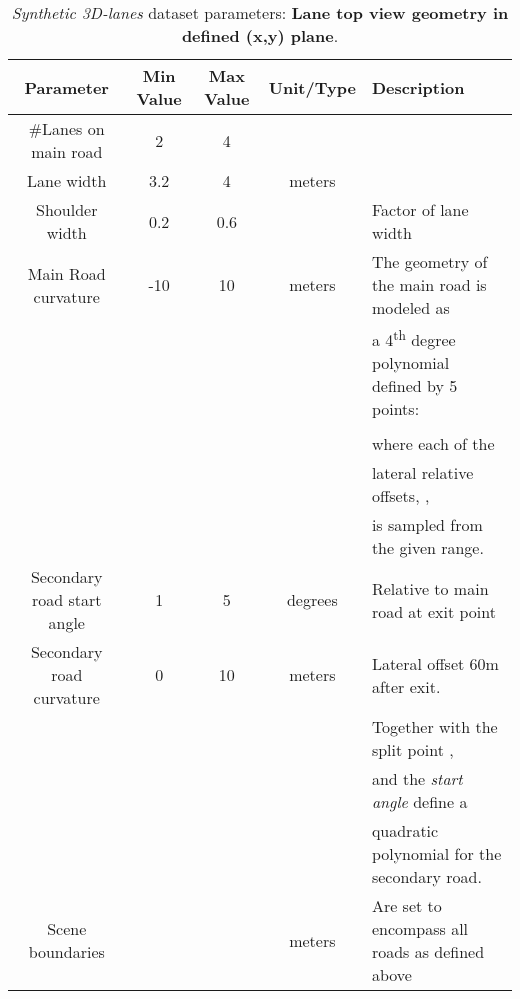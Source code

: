\documentclass[10pt,twocolumn,letterpaper]{article}
\begin{document}
\vspace{5cm}
\begin{table*}[h]
	\centering
	\caption{\emph{Synthetic 3D-lanes} dataset parameters: \textbf{Lane top view geometry in defined (x,y) plane}.}
	\begin{tabular} {ccccl}
		\toprule
		\textbf{Parameter} &  \textbf{Min Value} &  \textbf{Max Value} & \textbf{Unit/Type} & \textbf{Description}  \\
		\toprule		
		\#Lanes on main road & 2 & 4 & & \\
		\midrule
		Lane width & 3.2 & 4 & meters& \\
		\midrule
		Shoulder width & 0.2 & 0.6 & & Factor of lane width \\
		\midrule
		
		Main Road curvature & -10& 10& meters& The geometry of the main road is modeled as \\ 
		& & & & a 4\textsuperscript{th} degree polynomial defined by 5 points: \\
		& & & & \\
		& & & &  where each of the \\
		& & & & lateral relative offsets, , \\
		& & & & is sampled from the given range. \\
		
		\midrule
		
		Secondary road start angle & 1 & 5 & degrees & Relative to main road at exit point\\
		\midrule
		
		Secondary road curvature & 0  & 10  & meters & Lateral offset 60m after exit.\\
		& & & & Together with the split point ,\\
		& & & &  and the \textit{start angle} define a\\
		& & & &  quadratic polynomial for the secondary road.\\
		\midrule
		
		
		Scene boundaries & & & meters & Are set to encompass all roads as defined above\\
		\bottomrule
		
	\end{tabular} 
	\label{tab:real}
\end{table*}
\vspace{5cm}
\end{document}
